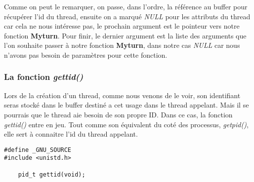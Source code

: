     Comme on peut le remarquer, on passe, dans l'ordre, la référence au buffer pour récupérer l'id du thread,
ensuite on a marqué \textit{NULL} pour les attributs du thread car cela ne nous intéresse pas, le prochain argument est le pointeur vers notre fonction \textbf{Myturn}. Pour finir, le dernier argument est la liste des arguments que l'on souhaite passer à notre fonction \textbf{Myturn}, dans notre cas \textit{NULL} car nous n'avons pas besoin de paramètres pour cette fonction.

\subsubsection{La fonction \textit{gettid()}}

Lors de la création d'un thread, comme nous venons de le voir, son identifiant seras stocké dans le buffer destiné a cet usage dans le thread appelant. Mais il se pourrais que le thread aie besoin de son propre ID. Dans ce cas, la fonction \textit{gettid()} entre en jeu. Tout comme son équivalent du coté des processus, \textit{getpid()}, elle sert à connaitre l'id du thread appelant.
\begin{lstlisting}
#define _GNU_SOURCE
#include <unistd.h>

    pid_t gettid(void);

\end{lstlisting}
